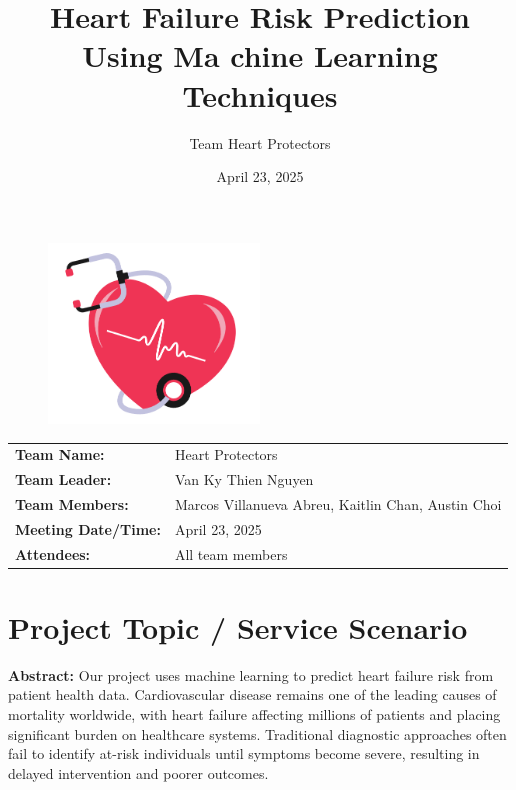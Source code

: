\documentclass[11pt,a4paper]{article}
\makeatletter
\renewcommand{\maketitle}{
  \begin{center}
    \vspace*{-0.25in} %
    {\LARGE \textbf{\@title}} \\[0.3cm]
    {\large \@subtitle} \\[0.2cm]
    {\normalsize \textit{\@author}} \\[0.1cm]
    {\normalsize \@date} \\
  \end{center}
  \vspace{0.3cm} %
}
\newcommand{\subtitle}[1]{\def\@subtitle{#1}}
\def\@subtitle{}
\makeatother
\begin{document}
\begin{figure}[H]
    \centering
    \includegraphics[width=0.5\textwidth]{./pictures/cover.png}
\end{figure}




\title{Heart Failure Risk Prediction Using Ma chine Learning Techniques}
\subtitle{Team Meeting Report – Final Report}
\author{Team Heart Protectors}
\date{April 23, 2025}


\begin{tabular}{ll}
    \textbf{Team Name:}         & Heart Protectors                                   \\
    \textbf{Team Leader:}       & Van Ky Thien Nguyen                                \\
    \textbf{Team Members:}      & Marcos Villanueva Abreu, Kaitlin Chan, Austin Choi \\
    \textbf{Meeting Date/Time:} & April 23, 2025                                     \\
    \textbf{Attendees:}         & All team members
\end{tabular}

\section{Project Topic / Service Scenario}

\textbf{Abstract:} Our project uses machine learning to predict heart failure risk from patient health data.
Cardiovascular disease remains one of the leading causes of mortality worldwide,
with heart failure affecting millions of patients and placing significant
burden on healthcare systems.
Traditional diagnostic approaches often fail to identify
at-risk individuals until symptoms become severe,
resulting in delayed intervention and poorer outcomes.
\end{document}
